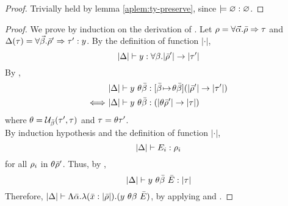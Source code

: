 
\thmsoundness

\begin{proof}
  Trivially held by lemma \ref{aplem:ty-preserve}, since $\models
  \varnothing:\varnothing$.
\end{proof}


\begin{proof}
  We prove by induction on the derivation of \TrRes. Let $\rho =
  \forall \vec{\alpha}. \bar{\rho} \Rightarrow \tau$ and 
  $\Delta(\tau) =
  \forall \vec{\beta}. \bar{\rho}' \Rightarrow \tau':y$. By the
  definition of function $|\cdot|$,
  \begin{equation*}
    |\Delta| \vdash y:\forall \beta. |\bar{\rho}'| \to |\tau'|
  \end{equation*}
  By \TyTyApp,
  \begin{align*}
    & |\Delta| \vdash y~\theta \bar{\beta}:[ \bar{\beta}\!\mapsto\!\theta \bar{\beta} ] (|\bar{\rho}'| \to
      |\tau'|) \\
    \Longleftrightarrow~ & |\Delta| \vdash y~\theta \bar{\beta}:(|\theta \bar{\rho}'| \to |\tau|)
  \end{align*}
  where $\theta = \mathcal{U}_{\bar{\beta}}(\tau', \tau)$ and $\tau =
  \theta \tau'$. \\
  By induction hypothesis and the definition of function $|\cdot|$,
  \begin{equation*}
    |\Delta| \vdash E_i:\rho_i
  \end{equation*}
  for all $\rho_i$ in $\theta \bar{\rho}'$. Thus, by \TyApp,
  \begin{equation*}
    |\Delta| \vdash y~\theta \bar{\beta}~\bar{E}:|\tau|
  \end{equation*}
  Therefore, $|\Delta| \vdash \Lambda \bar{\alpha}.\lambda(\bar{x} :
  |\bar{\rho}|).(y~\theta \beta~\bar{E})$, by applying \TyAbs{} and
  \TyTyAbs{}.

\end{proof}

